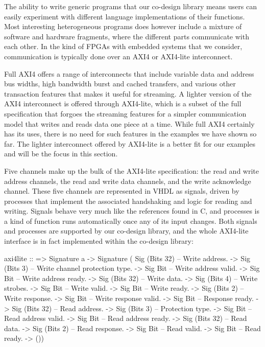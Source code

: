 \documentclass[../paper.tex]{subfiles}
\begin{document}
The ability to write generic programs that our co-design library means users can easily experiment with different language implementations of their functions. Most interesting heterogeneous programs does however include a mixture of software and hardware fragments, where the different parts communicate with each other. In the kind of FPGAs with embedded systems that we consider, communication is typically done over an AXI4 or AXI4-lite interconnect. 

Full AXI4 offers a range of interconnects that include variable data and address bus widths, high bandwidth burst and cached transfers, and various other transaction features that makes it useful for streaming. A lighter version of the AXI4 interconnect is offered through AXI4-lite, which is a subset of the full specification that forgoes the streaming features for a simpler communication model that writes and reads data one piece at a time. While full AXI4 certainly has its uses, there is no need for such features in the examples we have shown so far. The lighter interconnect offered by AXI4-lite is a better fit for our examples and will be the focus in this section.


Five channels make up the bulk of the AXI4-lite specification: the read and write address channels, the read and write data channels, and the write acknowledge channel. These five channels are represented in VHDL as signals, driven by processes that implement the associated handshaking and logic for reading and writing. Signals behave very much like the references found in C, and processes is a kind of function runs automatically once any of its input changes. Both signals and processes are supported by our co-design library, and the whole AXI4-lite interface is in fact implemented within the co-design library:


\begin{code}
axi4lite ::
  => Signature a
  -> Signature (
          Sig (Bits 32) -- Write address.
       -> Sig (Bits 3)  -- Write channel protection type.
       -> Sig Bit       -- Write address valid.
       -> Sig Bit       -- Write address ready.
       -> Sig (Bits 32) -- Write data.
       -> Sig (Bits 4)  -- Write strobes.
       -> Sig Bit       -- Write valid.
       -> Sig Bit       -- Write ready.
       -> Sig (Bits 2)  -- Write response.
       -> Sig Bit       -- Write response valid.
       -> Sig Bit       -- Response ready.
       -> Sig (Bits 32) -- Read address.
       -> Sig (Bits 3)  -- Protection type.
       -> Sig Bit       -- Read address valid.
       -> Sig Bit       -- Read address ready.
       -> Sig (Bits 32) -- Read data.
       -> Sig (Bits 2)  -- Read response.
       -> Sig Bit       -- Read valid.
       -> Sig Bit       -- Read ready.    
       -> ())
\end{code}
\end{document}
